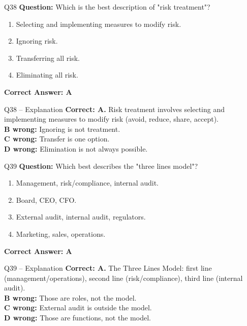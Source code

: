 \documentclass[aspectratio=169,10pt]{beamer}
\begin{document}
	\begin{frame}[t]{Q38}
		\small
		\textbf{Question:} Which is the best description of "risk treatment"?
		\begin{enumerate}[label=\Alph*.,itemsep=1pt,topsep=2pt]
			\item Selecting and implementing measures to modify risk.
			\item Ignoring risk.
			\item Transferring all risk.
			\item Eliminating all risk.
		\end{enumerate}
		\vspace{4pt}
		\textbf{Correct Answer: A}
	\end{frame}
	
	\begin{frame}[t]{Q38 -- Explanation}
		\small
		\textbf{Correct: A.} Risk treatment involves selecting and implementing measures to modify risk (avoid, reduce, share, accept). \\[4pt]
		\textbf{B wrong:} Ignoring is not treatment. \\[2pt]
		\textbf{C wrong:} Transfer is one option. \\[2pt]
		\textbf{D wrong:} Elimination is not always possible.
	\end{frame}
	
	\begin{frame}[t]{Q39}
		\small
		\textbf{Question:} Which best describes the "three lines model"?
		\begin{enumerate}[label=\Alph*.,itemsep=1pt,topsep=2pt]
			\item Management, risk/compliance, internal audit.
			\item Board, CEO, CFO.
			\item External audit, internal audit, regulators.
			\item Marketing, sales, operations.
		\end{enumerate}
		\vspace{4pt}
		\textbf{Correct Answer: A}
	\end{frame}
	
	\begin{frame}[t]{Q39 -- Explanation}
		\small
		\textbf{Correct: A.} The Three Lines Model: first line (management/operations), second line (risk/compliance), third line (internal audit). \\[4pt]
		\textbf{B wrong:} Those are roles, not the model. \\[2pt]
		\textbf{C wrong:} External audit is outside the model. \\[2pt]
		\textbf{D wrong:} Those are functions, not the model.
	\end{frame}
	
\end{document}
